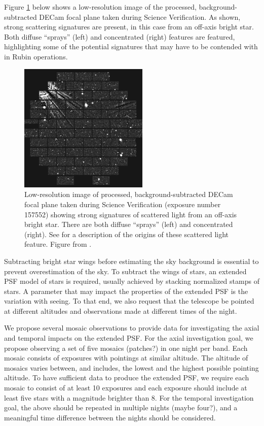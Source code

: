 \documentclass[SE,authoryear,toc]{lsstdoc}
\begin{document}
Figure \ref{fig:decam_scattered_light} below shows a low-resolution image of the processed, background-subtracted DECam focal plane taken during Science Verification.
As shown, strong scattering signatures are present, in this case from an off-axis bright star.
Both diffuse ``sprays'' (left) and concentrated (right) features are featured, highlighting some of the potential signatures that may have to be contended with in Rubin operations.

\begin{figure}
\centering
\includegraphics[width=0.55\textwidth]{fig/D00157552_z_r3727p01_sv_400x400.png}
\caption{
Low-resolution image of processed, background-subtracted DECam focal plane taken during Science Verification (exposure number 157552) showing strong signatures of scattered light from an off-axis bright star.
There are both diffuse ``sprays'' (left) and concentrated (right).
See \citet{Kent2013} for a description of the origins of these scattered light feature.
Figure from \citet{Chang2021}.
}
\label{fig:decam_scattered_light}
\end{figure}

Subtracting bright star wings before estimating the sky background is essential to prevent overestimation of the sky.
To subtract the wings of stars, an extended PSF model of stars is required, usually achieved by stacking normalized stamps of stars.
A parameter that may impact the properties of the extended PSF is the variation with seeing.
To that end, we also request that the telescope be pointed at different altitudes and observations made at different times of the night.

We propose several mosaic observations to provide data for investigating the axial and temporal impacts on the extended PSF. 
For the axial investigation goal, we propose observing a set of five mosaics (patches?) in one night per band.
Each mosaic consists of exposures with pointings at similar altitude.
The altitude of mosaics varies between, and includes, the lowest and the highest possible pointing altitude. 
To have sufficient data to produce the extended PSF, we require each mosaic to consist of at least 10 exposures and each exposure should include at least five stars with a magnitude brighter than 8. 
For the temporal investigation goal, the above should be repeated in multiple nights (maybe four?), and a meaningful time difference between the nights should be considered. 
\end{document}
